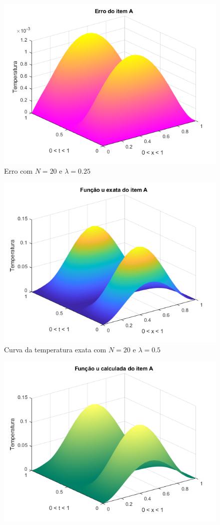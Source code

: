\documentclass[12pt]{article}
\begin{document}
\begin{spacing}{1.5}
\begin{figure}
    \includegraphics[width=0.8\linewidth]{Primeira_Tarefa/ItemA/n20_lambda0-25_erro.png}
    \caption{Erro com $N=20$ e $\lambda=0.25$}
    \label{fig:A_n20lambda0-25_erro}
\end{figure}
\begin{figure}
    \centering
    \includegraphics[width=0.8\linewidth]{Primeira_Tarefa/ItemA/n20_lambda0-5_exata.png}
    \caption{Curva da temperatura exata com $N=20$ e $\lambda=0.5$}
    \label{fig:A_n20lambda0-5_exata}
\end{figure}
\begin{figure}
    \centering
    \includegraphics[width=0.8\linewidth]{Primeira_Tarefa/ItemA/n20_lambda0-5_calc.png}

\end{figure}
\end{spacing}
\end{document}
